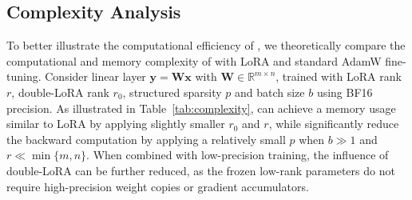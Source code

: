 \subsection{Complexity Analysis}
To better illustrate the computational efficiency of \celora, we theoretically compare the computational and memory complexity of \celora with LoRA and standard AdamW fine-tuning. Consider linear layer $\mathbf{y}=\mathbf{W}\mathbf{x}$ with $\mathbf{W}\in\mathbb{R}^{m\times n}$, trained with LoRA rank $r$, double-LoRA rank $r_0$, structured sparsity $p$ and batch size $b$ using BF16 precision. As illustrated in Table~\ref{tab:complexity}, \celora can achieve a memory usage similar to LoRA by applying slightly smaller $r_0$ and $r$, while significantly reduce the backward computation by applying a relatively small $p$ when $b\gg 1$ and $r\ll\min\{m,n\}$. 
When combined with low-precision training, the influence of double-LoRA can be further reduced, as the frozen low-rank parameters do not require high-precision weight copies or gradient accumulators.
